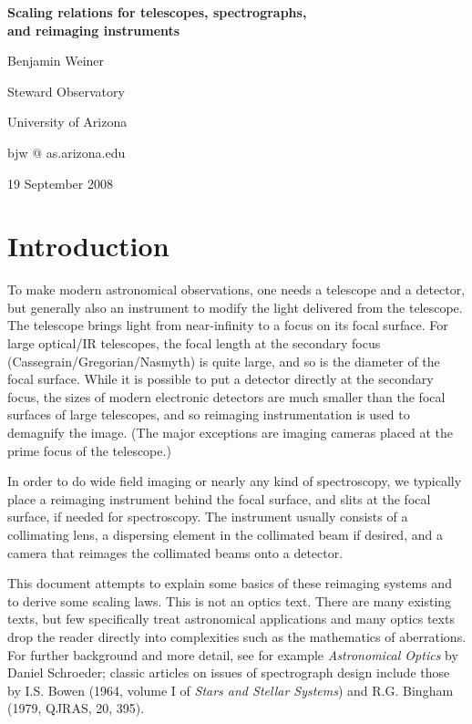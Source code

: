 \documentclass[12pt]{article}
\begin{document}
{\bf\Large Scaling relations for telescopes, spectrographs, \\
 and reimaging instruments}

\bigskip

{\large 
Benjamin Weiner

Steward Observatory

University of Arizona

}

bjw @ as.arizona.edu

19 September 2008


\bigskip

\section{Introduction}

To make modern astronomical observations, one needs a telescope
and a detector, but generally also an instrument to modify the
light delivered from the telescope.
The telescope brings light from near-infinity to
a focus on its focal surface.  For large optical/IR
telescopes, the focal length at the secondary focus
(Cassegrain/Gregorian/Nasmyth) is quite large, and so is
the diameter of the focal surface.  While it is possible to
put a detector directly at the secondary focus, the sizes
of modern electronic detectors are much smaller than the focal
surfaces of large telescopes, and so reimaging instrumentation
is used to demagnify the image.  (The major exceptions
are imaging cameras placed at the prime focus of the telescope.)

In order to do wide
field imaging or nearly any kind of spectroscopy, we typically place
a reimaging instrument 
behind the focal surface, and slits at the 
focal surface, if needed for spectroscopy.
The instrument usually consists
of a collimating lens, a dispersing element in the collimated
beam if desired, and a camera that reimages the collimated
beams onto a detector.

This document attempts to explain some basics of these reimaging systems
and to derive some scaling laws.  This is not an optics text.
There are many existing texts, but few specifically treat
astronomical applications and many optics texts drop the reader
directly into complexities such as the mathematics of aberrations.  
For further background and more detail, see for example 
{\it Astronomical Optics} by Daniel Schroeder; classic articles
on issues of spectrograph design include those by I.S. Bowen 
(1964, volume I of {\it Stars and Stellar Systems}) and 
R.G. Bingham (1979, QJRAS, 20, 395).
\end{document}
